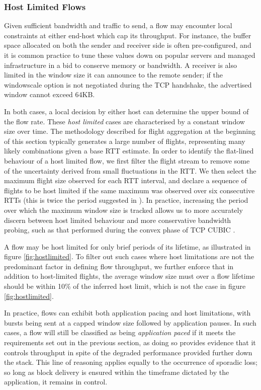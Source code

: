 \subsubsection{Host Limited Flows}
\label{sssec:host}

Given sufficient bandwidth and traffic to send, a flow may encounter local constraints at either end-host which cap its throughput. 
For instance, the buffer space allocated on both the sender and receiver side is often pre-configured, and it is common practice to tune these values down on popular servers and managed infrastructure in a bid to conserve memory or bandwidth.
A receiver is also limited in the window size it can announce to the remote sender; if the windowscale option \cite{jacobson1992tcp} is not negotiated during the TCP handshake, the advertised window cannot exceed 64KB.

In both cases, a local decision by either host can determine the upper bound of the flow rate.
These \emph{host limited} cases are characterised by a constant window size over time.
The methodology described for flight aggregation at the beginning of this section typically generates a large number of flights, representing many likely combinations given a base RTT estimate.
In order to identify the flat-lined behaviour of a host limited flow, we first filter the flight stream to remove some of the uncertainty derived from small fluctuations in the RTT.
We then select the maximum flight size observed for each RTT interval, and declare a sequence of flights to be host limited if the same maximum was observed over six consecutive RTTs (this is twice the period suggested in \cite{Zhang:2002p85}).
In practice, increasing the period over which the maximum window size is tracked allows us to more accurately discern between host limited behaviour and more conservative bandwidth probing, such as that performed during the convex phase of TCP CUBIC \cite{Ha:2008p471}.

A flow may be host limited for only brief periods of its lifetime, as illustrated in figure \ref{fig:hostlimited}.
To filter out such cases where host limitations are not the predominant factor in defining flow throughput, we further enforce that in addition to host-limited flights, the average window size must over a flow lifetime should be within 10\% of the inferred host limit, which is not the case in figure \ref{fig:hostlimited}.

In practice, flows can exhibit both application pacing and host limitations, with bursts being sent at a capped window size followed by application pauses.
In such cases, a flow will still be classified as being \emph{application paced} if it meets the requirements set out in the previous section, as doing so provides evidence that it controls throughput in spite of the degraded performance provided further down the stack. 
This line of reasoning applies equally to the occurrence of sporadic loss; so long as block delivery is ensured within the timeframe dictated by the application, it remains in control.

